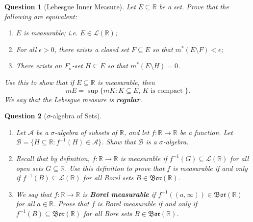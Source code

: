 \documentclass[notoc,notitlepage]{tufte-book}
\newtheorem{assgprob}{Question}[section]
\newcommand{\Bor}{\mathfrak{Bor}}
\begin{document}
\begin{assgprob}[Lebesgue Inner Measure]
  Let $E \subseteq \mathbb{R}$ be a set. Prove that the following are equivalent:
  \begin{enumerate}
    \item $E$ is measurable; i.e. $E \in \mathcal{L}(\mathbb{R})$;
    \item For all $\epsilon > 0$, there exists a closed set $F \subseteq E$
      so that $m^*(E \setminus F) < \epsilon$;
    \item There exists an $F_\sigma$-set $H \subseteq E$
      so that $m^*(E \setminus H) = 0$.
  \end{enumerate}
  Use this to show that if $E \subseteq \mathbb{R}$ is measurable, then
  \begin{equation*}
    mE = \sup \{ mK : K \subseteq E,\, K \text{ is compact } \}.
  \end{equation*}
  We say that the Lebesgue measure is \textbf{regular}. 
\end{assgprob}

\begin{assgprob}[$\sigma$-algebra of Sets]
  \begin{enumerate}
    \item Let $\mathcal{A}$ be a $\sigma$-algebra of subsets of $\mathbb{R}$,
      and let $f : \mathbb{R} \to \mathbb{R}$ be a function.
      Let $\mathcal{B} = \{ H \subseteq \mathbb{R} : f^{-1}(H) \in \mathcal{A} \}$.
      Show that $\mathcal{B}$ is a $\sigma$-algebra.
    \item Recall that by definition, $f : \mathbb{R} \to \mathbb{R}$
      is measurable if $f^{-1}(G) \subseteq \mathcal{L}(\mathbb{R})$
      for all open sets $G \subseteq \mathbb{R}$.
      Use this definition to prove that $f$ is measurable
      if and only if $f^{-1}(B) \subseteq \mathcal{L}(\mathbb{R})$
      for all Borel sets $B \in \Bor(\mathbb{R})$.
    \item We say that $f : \mathbb{R} \to \mathbb{R}$ is
      \textbf{Borel measurable} if $f^{-1}((a, \infty)) \in \Bor(\mathbb{R})$
      for all $a \in \mathbb{R}$.
      Prove that $f$ is Borel measurable if and only if
      $f^{-1}(B) \subseteq \Bor(\mathbb{R})$
      for all Bore sets $B \in \Bor(\mathbb{R})$.
  \end{enumerate}
\end{assgprob}
\end{document}
